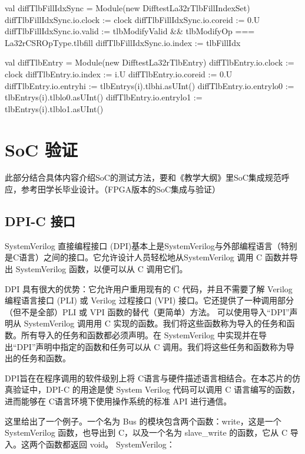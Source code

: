 \begin{CodeBlock}[language=BookScala]
val diffTlbFillIdxSync = Module(new DifftestLa32rTlbFillIndexSet)
diffTlbFillIdxSync.io.clock := clock
diffTlbFillIdxSync.io.coreid := 0.U
diffTlbFillIdxSync.io.valid := tlbModifyValid && tlbModifyOp === La32rCSROpType.tlbfill
diffTlbFillIdxSync.io.index := tlbFillIdx
    
val diffTlbEntry = Module(new DifftestLa32rTlbEntry)
diffTlbEntry.io.clock := clock
diffTlbEntry.io.index := i.U
diffTlbEntry.io.coreid := 0.U
diffTlbEntry.io.entryhi := tlbEntrys(i).tlbhi.asUInt()
diffTlbEntry.io.entrylo0 := tlbEntrys(i).tlblo0.asUInt()
diffTlbEntry.io.entrylo1 := tlbEntrys(i).tlblo1.asUInt()
\end{CodeBlock}

\section{SoC 验证}\label{sec:06-agility-018}

此部分结合具体内容介绍SoC的测试方法，要和《教学大纲》里SoC集成规范呼应，参考田学长毕业设计。（FPGA版本的SoC集成与验证）

\subsection{DPI-C 接口}\label{sec:06-agility-019}

SystemVerilog 直接编程接口 (DPI)基本上是SystemVerilog与外部编程语言（特别是C语言）之间的接口。它允许设计人员轻松地从SystemVerilog 调用 C 函数并导出 SystemVerilog 函数，以便可以从 C 调用它们。

DPI 具有很大的优势：它允许用户重用现有的 C 代码，并且不需要了解 Verilog 编程语言接口 (PLI) 或 Verilog 过程接口 (VPI) 接口。它还提供了一种调用部分（但不是全部）PLI 或 VPI 函数的替代（更简单）方法。 可以使用导入``DPI''声明从 SystemVerilog 调用用 C 实现的函数。我们将这些函数称为导入的任务和函数。所有导入的任务和函数都必须声明。在 SystemVerilog 中实现并在导出``DPI''声明中指定的函数和任务可以从 C 调用。我们将这些任务和函数称为导出的任务和函数。

DPI旨在在程序调用的软件级别上将 C语言与硬件描述语言相结合。在本芯片的仿真验证中，DPI-C 的用途是使 System Verilog 代码可以调用 C 语言编写的函数，进而能够在 C语言环境下使用操作系统的标准 API 进行通信。

这里给出了一个例子。一个名为 Bus 的模块包含两个函数：write，这是一个 SystemVerilog 函数，也导出到 C，以及一个名为 slave\_write 的函数，它从 C 导入。这两个函数都返回 void。 SystemVerilog：


